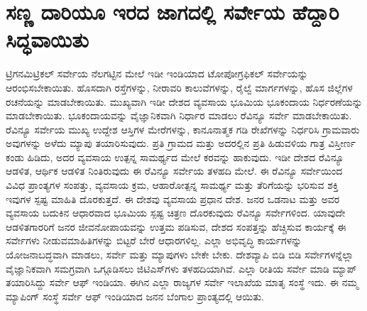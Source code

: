 
\chapter{ಸಣ್ಣ ದಾರಿಯೂ ಇರದ ಜಾಗದಲ್ಲಿ ಸರ್ವೇಯ ಹೆದ್ದಾರಿ ಸಿದ್ಧವಾಯಿತು}

ಟ್ರಿಗನಮಿಟ್ರಿಕಲ್​ ಸರ್ವೇಯ ನೆಲಗಟ್ಟಿನ ಮೇಲೆ ಇಡೀ ಇಂಡಿಯಾದ ಟೋಪೋಗ್ರಫಿಕಲ್​ ಸರ್ವೇಯನ್ನು ಆರಂಭಿಸಬೇಕಾಯಿತು. ಹೊಸದಾಗಿ ರಸ್ತೆಗಳನ್ನು, ನೀರಾವರಿ ಕಾಲುವೆಗಳನ್ನು, ರೈಲ್ವೆ ಮಾರ್ಗಗಳನ್ನು, ಹೊಸ ಜಿಲ್ಲೆಗಳ ರಚನೆಯನ್ನು ಮಾಡಬೇಕಾಯಿತು. ಮುಖ್ಯವಾಗಿ ಇಡೀ ದೇಶದ ವ್ಯವಸಾಯ ಭೂಮಿಯ ಭೂಕಂದಾಯ ನಿರ್ಧರಣೆಯನ್ನು ಮಾಡಬೇಕಾಯಿತು. ಭೂಕಂದಾಯವನ್ನು ವೈಜ್ಞಾನಿಕವಾಗಿ ನಿರ್ಧಾರ ಮಾಡಲು ರೆವಿನ್ಯೂ ಸರ್ವೇ ಮಾಡಬೇಕಾಯಿತು. ರೆವಿನ್ಯೂ ಸರ್ವೇಯ ಮುಖ್ಯ ಉದ್ದೇಶ ಆಸ್ತಿಗಳ ಮೇರೆಗಳನ್ನು, ಕಾನೂನಾತ್ಮಕ ಗಡಿ ರೇಖೆಗಳನ್ನು ನಿರ್ಧರಿಸಿ ಗ್ರಾಮವಾರು ಅವುಗಳನ್ನು ಅಳೆದು ಮ್ಯಾಪು ತಯಾರಿಸುವುದು. ಪ್ರತಿ ಗ್ರಾಮದ ಮತ್ತು ಅದರಲ್ಲಿನ ಪ್ರತಿ ಹಿಡುವಳಿಯ ಗಾತ್ರ ವಿಸ್ತೀರ್ಣ ಕಂಡು ಹಿಡಿದು, ಅದರ ವ್ಯವಸಾಯ ಉತ್ಪನ್ನ ಸಾಮರ್ಥ್ಯದ ಮೇಲೆ ಕರವನ್ನು ಹಾಕುವುದು. ಇಡೀ ದೇಶದ ರೆವಿನ್ಯೂ ಆಡಳಿತ, ಆರ್ಥಿಕ ಆಡಳಿತ ನಿಂತಿರುವುದು ಈ ರೆವಿನ್ಯೂ ಸರ್ವೇಯ ತಳಹದಿ ಮೇಲೆ. ಈ ರೆವಿನ್ಯೂ ಸರ್ವೇಯಿಂದ ವಿವಿಧ ಪ್ರಾಂತ್ಯಗಳ ಸಂಪತ್ತು, ವ್ಯವಸಾಯ ಕ್ರಮ, ಆಹಾರೋತ್ಪನ್ನ ಸಾಮರ್ಥ್ಯ ಮತ್ತು ತೆರಿಗೆಯನ್ನು ಭರಿಸುವ ಶಕ್ತಿ ಇವುಗಳ ಸ್ಪಷ್ಟ ಮಾಹಿತಿ ದೊರಕುತ್ತದೆ. ಈ ದೇಶವು ವ್ಯವಸಾಯ ಪ್ರಧಾನ ದೇಶ. ಜನರ ಒಡನಾಟ ಮತ್ತು ಅವರ ವ್ಯವಸಾಯ ಬದುಕಿನ ಆಧಾರವಾದ ಭೂಮಿಯ ಸ್ಪಷ್ಟ ಚಿತ್ರಣ ದೊರಕುವುದು ರೆವಿನ್ಯೂ ಸರ್ವೇಗಳಿಂದ. ಯಾವುದೇ ಆಡಳಿತಗಾರರಿಗೆ ಜನರ ಜೀವನೋಪಾಯವನ್ನು ಉತ್ತಮ ಪಡಿಸುವ, ದೇಶದ ಸಂಪತ್ತನ್ನು ಹೆಚ್ಚಿಸುವ ಕಾರ್ಯಕ್ಕೆ ಈ ಸರ್ವೇಗಳು ನೀಡುವ\break ಮಾಹಿತಿಗಳನ್ನು ಬಿಟ್ಟರೆ ಬೇರೆ ಆಧಾರಗಳಿಲ್ಲ. ಎಲ್ಲಾ ಅಭಿವೃದ್ಧಿ ಕಾರ್ಯಗಳನ್ನು ಯೋಜನಾಬದ್ಧವಾಗಿ ಮಾಡಲು, ಸರ್ವೇ ಮತ್ತು ಮ್ಯಾಪುಗಳು ಬೇಕೇ ಬೇಕು. ದೇಶವ್ಯಾಪಿ ಬಿಡಿ ಬಿಡಿ ಸರ್ವೇಗಳನ್ನೆಲ್ಲಾ ವೈಜ್ಞಾನಿಕವಾಗಿ ಸಮಗ್ರವಾಗಿ ಒಗ್ಗೂಡಿಸಲು ಜಿಟಿಎಸ್​ಗಳು ತಳಹದಿಯಾಗಿವೆ. ಎಲ್ಲಾ ರೀತಿಯ ಸರ್ವೇ ಮಾಡಿ ಮ್ಯಾಪ್​ ತಯಾರಿಸಿದ್ದು ಸರ್ವೇ ಆಫ್​ ಇಂಡಿಯಾ. ಈಗಿನ ಎಲ್ಲಾ ರಾಜ್ಯಗಳ ಸರ್ವೇ ಇಲಾಖೆಯ ಮಾತೃ ಸಂಸ್ಥೆ ಇದು. ಈ ನಮ್ಮ ಮ್ಯಾಪಿಂಗ್​ ಸಂಸ್ಥೆ ಸರ್ವೇ ಆಫ್​ ಇಂಡಿಯಾದ ಜನನ ಬೆಂಗಾಲ ಪ್ರಾಂತ್ಯದಲ್ಲಿ ಆಯಿತು.

\vskip 3pt

